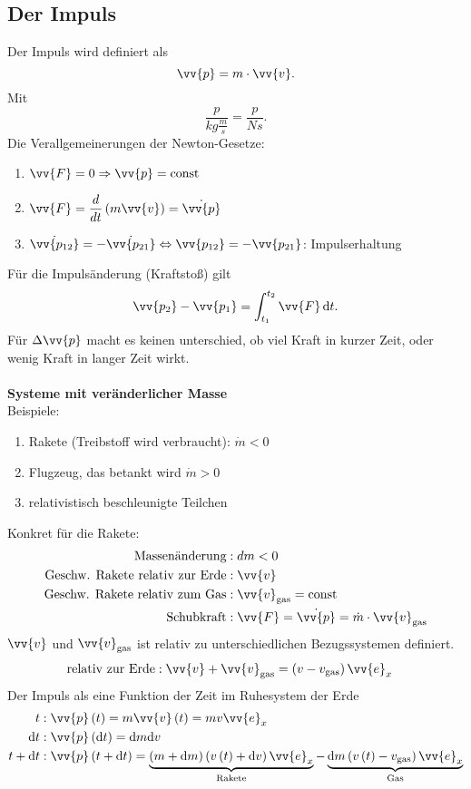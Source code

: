 \documentclass[a4paper,12pt]{article}
\newcommand{\td}{\,\text{d}}
\begin{document}
\subsection{Der Impuls}
Der Impuls wird definiert als
\[ 
        \vv{p}=m\cdot \vv{v}
.\] 
Mit
\[ 
        \dfrac{p}{kg\tfrac{m}{s}}=\dfrac{p}{Ns}
.\] 
Die Verallgemeinerungen der Newton-Gesetze:
\begin{enumerate}[label=\arabic*. NG,wide]
        \item $\vv{F}=0\Rightarrow \vv{p}=\text{const}$ 
        \item $\vv{F}=\dfrac{d}{dt}\left(m\vv{v}\right)=\dot{\vv{p}}$ 
        \item $\dot{\vv{p_{12} }}=-\dot{\vv{p_{21} }}\Leftrightarrow \vv{p_{12}}=-\vv{p_{21}}$: Impulserhaltung
\end{enumerate}
Für die Impulsänderung (\grqq Kraftstoß\grqq) gilt
\[ 
        \vv{p_2}-\vv{p_1}=\int_{t_1}^{t_2}\vv{F}\td t
.\] 
Für $\Delta \vv{p} $ macht es keinen unterschied, ob viel Kraft in kurzer Zeit, oder wenig Kraft in langer Zeit wirkt.
\\\hfill\\\textbf{Systeme mit veränderlicher Masse}\\ 
Beispiele:
\begin{enumerate}[label=]
        \item Rakete (Treibstoff wird verbraucht): $\dot{m}<0$ 
        \item Flugzeug, das betankt wird $\dot{m}>0$ 
        \item relativistisch beschleunigte Teilchen
\end{enumerate}
Konkret für die Rakete:
\begin{align*}
        \text{Massenänderung}&:dm<0\\
        \text{Geschw. Rakete relativ zur Erde}&:\vv{v}\\
        \text{Geschw. Rakete relativ zum Gas}&:\vv{v}_{\text{gas}}=\text{const}\\
        \text{Schubkraft}&:\vv{F}=\dot{\vv{p}}=\dot{m}\cdot \vv{v}_{\text{gas}}
\end{align*}
$\vv{v}$ und $\vv{v}_{\text{gas}}$ ist relativ zu unterschiedlichen Bezugssystemen definiert.
\begin{align*}
        \text{relativ zur Erde}&:\vv{v}+\vv{v}_{\text{gas}}=\left(v-v_{\text{gas}}\right)\vv{e}_x
\end{align*}
Der Impuls als eine Funktion der Zeit im Ruhesystem der Erde
\begin{align*}
        t&:\vv{p}\left(t\right)=m\vv{v}\left(t\right)=mv \vv{e}_x\\
        \text{d}t&:\vv{p}\left(\text{d}t\right)=\text{d}m\text{d}v\\
        t+\text{d}t&:\vv{p}\left(t+\text{d}t\right)=\underbrace{\left(m+\text{d}m\right)\left(v\left(t\right)+\text{d}v\right)\vv{e}_x}_{\text{Rakete}}-\underbrace{\text{d}m\left(v\left(t\right)-v_{\text{gas}}\right)\vv{e}_x}_{\text{Gas}}
\end{align*}
\end{document}

